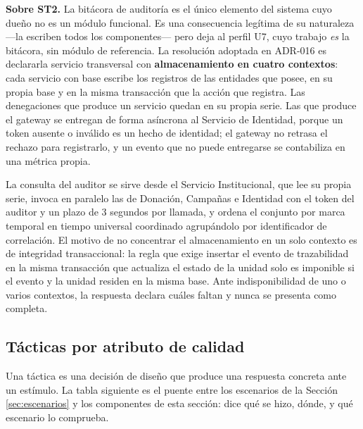 \documentclass[11pt,a4paper]{article}
\begin{document}
\noindent\textbf{Sobre ST2.} La bitácora de auditoría es el único elemento del sistema cuyo dueño no es un módulo funcional. Es una consecuencia legítima de su naturaleza ---la escriben todos los componentes--- pero deja al perfil U7, cuyo trabajo \emph{es} la bitácora, sin módulo de referencia. La resolución adoptada en ADR-016 es declararla servicio transversal con \textbf{almacenamiento en cuatro contextos}: cada servicio con base escribe los registros de las entidades que posee, en su propia base y en la misma transacción que la acción que registra. Las denegaciones que produce un servicio quedan en su propia serie. Las que produce el gateway se entregan de forma asíncrona al Servicio de Identidad, porque un token ausente o inválido es un hecho de identidad; el gateway no retrasa el rechazo para registrarlo, y un evento que no puede entregarse se contabiliza en una métrica propia.

\vspace{0.2cm}
\noindent La consulta del auditor se sirve desde el Servicio Institucional, que lee su propia serie, invoca en paralelo las de Donación, Campañas e Identidad con el token del auditor y un plazo de 3 segundos por llamada, y ordena el conjunto por marca temporal en tiempo universal coordinado agrupándolo por identificador de correlación. El motivo de no concentrar el almacenamiento en un solo contexto es de integridad transaccional: la regla que exige insertar el evento de trazabilidad en la misma transacción que actualiza el estado de la unidad solo es imponible si el evento y la unidad residen en la misma base. Ante indisponibilidad de uno o varios contextos, la respuesta declara cuáles faltan y nunca se presenta como completa.

\subsection{Tácticas por atributo de calidad}

Una táctica es una decisión de diseño que produce una respuesta concreta ante un estímulo. La tabla siguiente es el puente entre los escenarios de la Sección \ref{sec:escenarios} y los componentes de esta sección: dice qué se hizo, dónde, y qué escenario lo comprueba.
\end{document}
